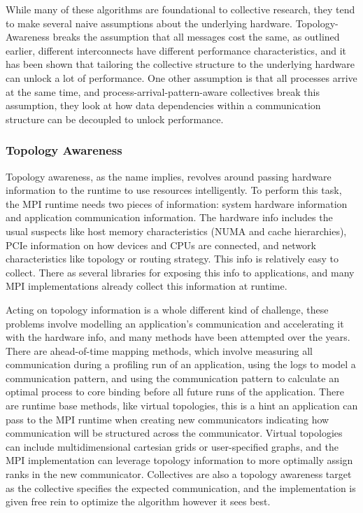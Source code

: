 While many of these algorithms are foundational to collective research, they tend to make several naive assumptions about the underlying hardware.
Topology-Awareness breaks the assumption that all messages cost the same, as outlined earlier, different interconnects have different performance characteristics, and it has been shown that tailoring the collective structure to the underlying hardware can unlock a lot of performance. 
One other assumption is that all processes arrive at the same time, and process-arrival-pattern-aware collectives break this assumption, they look at how data dependencies within a communication structure can be decoupled to unlock performance.

\subsubsection{Topology Awareness}
Topology awareness, as the name implies, revolves around passing hardware information to the runtime to use resources intelligently.
To perform this task, the MPI runtime needs two pieces of information: system hardware information and application communication information.
The hardware info includes the usual suspects like host memory characteristics (NUMA and cache hierarchies), PCIe information on how devices and CPUs are connected, and network characteristics like topology or routing strategy.
This info is relatively easy to collect.
There as several libraries for exposing this info to applications, and many MPI implementations already collect this information at runtime.

Acting on topology information is a whole different kind of challenge, these problems involve modelling an application's communication and accelerating it with the hardware info, and many methods have been attempted over the years.
There are ahead-of-time mapping methods, which involve measuring all communication during a profiling run of an application, using the logs to model a communication pattern, and using the communication pattern to calculate an optimal process to core binding before all future runs of the application. 
There are runtime base methods, like  virtual topologies, this is a hint an application can pass to the MPI runtime when creating new communicators indicating how communication will be structured across the communicator.
Virtual topologies can include multidimensional cartesian grids or user-specified graphs, and the MPI implementation can leverage topology information to more optimally assign ranks in the new communicator.
Collectives are also a topology awareness target as the collective specifies the expected communication, and the implementation is given free rein to optimize the algorithm however it sees best.

